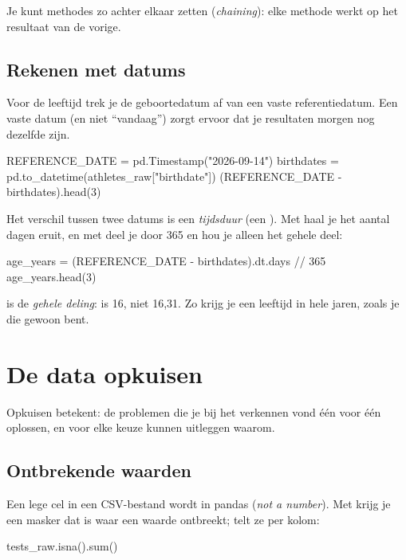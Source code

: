 \documentclass[11pt,a4paper]{article}
\begin{document}
Je kunt methodes zo achter elkaar zetten (\emph{chaining}): elke methode
werkt op het resultaat van de vorige.

\subsection{Rekenen met datums}

Voor de leeftijd trek je de geboortedatum af van een vaste
referentiedatum. Een vaste datum (en niet ``vandaag'') zorgt ervoor dat
je resultaten morgen nog dezelfde zijn.

\begin{python}
REFERENCE_DATE = pd.Timestamp("2026-09-14")
birthdates = pd.to_datetime(athletes_raw["birthdate"])
(REFERENCE_DATE - birthdates).head(3)
\end{python}

Het verschil tussen twee datums is een \emph{tijdsduur} (een
). Met  haal je het aantal dagen eruit, en
met  deel je door 365 en hou je alleen het gehele deel:

\begin{python}
age_years = (REFERENCE_DATE - birthdates).dt.days // 365
age_years.head(3)
\end{python}

\code{//} is de \emph{gehele deling}:  is 16, niet
16,31. Zo krijg je een leeftijd in hele jaren, zoals je die gewoon bent.

\section{De data opkuisen}\label{sec:opkuisen}

Opkuisen betekent: de problemen die je bij het verkennen vond één voor
één oplossen, en voor elke keuze kunnen uitleggen waarom.

\subsection{Ontbrekende waarden}

Een lege cel in een CSV-bestand wordt in pandas  (\emph{not a
number}). Met  krijg je een masker dat  is waar
een waarde ontbreekt;  telt ze per kolom:

\begin{python}
tests_raw.isna().sum()
\end{python}
\end{document}
